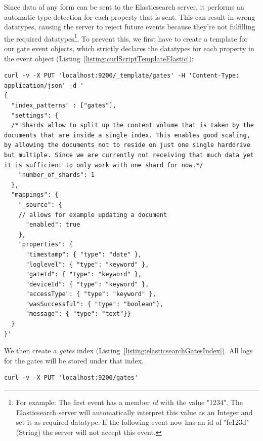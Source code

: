 Since data of any form can be sent to the Elasticsearch server, it performs an automatic type detection for each property that is sent. This can result in wrong datatypes, causing the server to reject future events because they're not fulfilling the required datatypes\footnote{For example: The first event has a member \emph{id} with the value "1234". The Elasticsearch server will automatically interpret this value as an Integer and set it as required datatype. If the following event now has an id of "fe123d" (String) the server will not accept this event.}. To prevent this, we first have to create a template for our gate event objects, which strictly declares the datatypes for each property in the event object (Listing~\ref{listing:curlScriptTemplateElastic}):

\clearpage

\begin{lstlisting}[label={listing:curlScriptTemplateElastic},caption={cURL script for creating gates index template}]
curl -v -X PUT 'localhost:9200/_template/gates' -H 'Content-Type: application/json' -d '
{
  "index_patterns" : ["gates"],
  "settings": {
  /* Shards allow to split up the content volume that is taken by the documents that are inside a single index. This enables good scaling, by allowing the documents not to reside on just one single harddrive but multiple. Since we are currently not receiving that much data yet it is sufficient to only work with one shard for now.*/
    "number_of_shards": 1
  },
  "mappings": {
    "_source": {
    // allows for example updating a document
      "enabled": true
    },
    "properties": {
      "timestamp": { "type": "date" },
      "loglevel": { "type": "keyword" },
      "gateId": { "type": "keyword" },
      "deviceId": { "type": "keyword" },
      "accessType": { "type": "keyword" },
      "wasSuccessful": { "type": "boolean"},
      "message": { "type": "text"}}
  }
}'
\end{lstlisting}


We then create a \emph{gates} index (Listing~\ref{listing:elasticsearchGatesIndex}). All logs for the gates will be stored under that index.

\begin{lstlisting}[label={listing:elasticsearchGatesIndex},caption={cURL script for creating gates index}]
curl -v -X PUT 'localhost:9200/gates'
\end{lstlisting}

